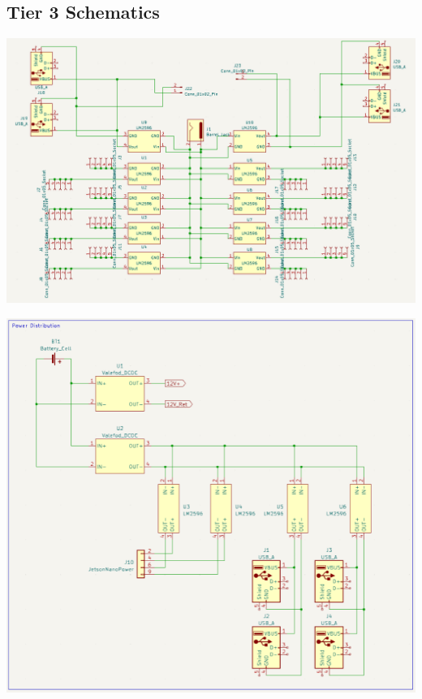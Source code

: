 \documentclass[a4paper, 10pt]{article}
\begin{document}
	\subsection{Tier 3 Schematics}

\includegraphics[scale=0.7]{Puzzle Panel schematic 1}	
	
	
\includegraphics[scale=1.05]{Rover schematic 1}
\end{document}
